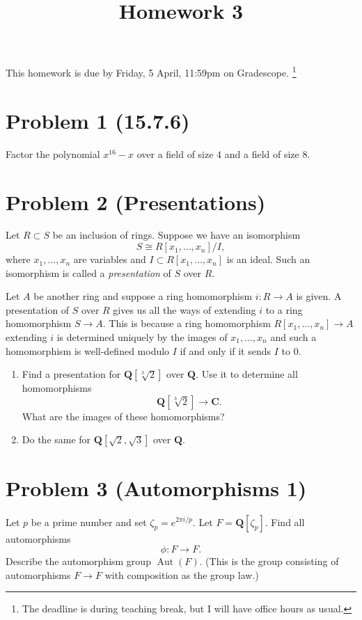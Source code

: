 \documentclass{amsart}
\date{}
\title{Homework 3}
\begin{document}
\maketitle
This homework is due by Friday, 5 April, 11:59pm on Gradescope.
\footnote{The deadline is during teaching break, but I will have office hours as usual.}
\section{Problem 1 (15.7.6)}
\label{sec:org0a29665}

Factor the polynomial \(x^{16}-x\) over a field of size \(4\) and a field of size \(8\).
\section{Problem 2 (Presentations)}
\label{sec:org5f9268e}

Let \(R \subset S\) be an inclusion of rings.
Suppose we have an isomorphism
\[ S \cong R[x_1, \dots, x_n]/I, \]
where \(x_1, \dots, x_n\) are variables and \(I \subset R[x_1, \dots, x_n]\) is an ideal.
Such an isomorphism is called a \emph{presentation} of \(S\) over \(R\).

Let \(A\) be another ring and suppose a ring homomorphism \(i \colon R \to A\) is given.
A presentation of \(S\) over \(R\) gives us all the ways of extending \(i\) to a ring homomorphism \(S \to A\).
This is because a ring homomorphism \(R[x_1,\dots,x_n] \to A\) extending \(i\) is determined uniquely by the images of \(x_1, \dots, x_n\) and such a homomorphism is well-defined modulo \(I\) if and only if it sends \(I\) to \(0\).

\begin{enumerate}
\item Find a presentation for \(\mathbf{Q}[\sqrt[3]{2}]\) over \(\mathbf{Q}\).
Use it to determine all homomorphisms
\[ \mathbf{Q}[\sqrt[3] 2] \to \mathbf{C}.\]
What are the images of these homomorphisms?

\item Do the same for \(\mathbf{Q}[\sqrt 2, \sqrt 3]\) over \(\mathbf{Q}\).
\end{enumerate}
\section{Problem 3 (Automorphisms 1)}
\label{sec:org61a346f}

Let \(p\) be a prime number and set \(\zeta_p = e^{2\pi i / p}\).
Let \(F = \mathbf{Q}[\zeta_p]\).
Find all automorphisms
\[ \phi \colon F \to F.\]
Describe the automorphism group \(\operatorname{Aut}(F)\).
(This is the group consisting of automorphisms \(F \to F\) with composition as the group law.)
\end{document}
